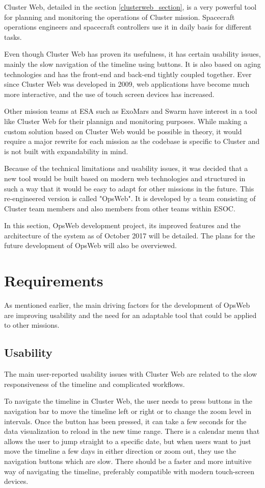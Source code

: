 Cluster Web, detailed in the section \ref{clusterweb_section}, is a very powerful tool for planning and monitoring the operations of Cluster mission. Spacecraft operations engineers and spacecraft controllers use it in daily basis for different tasks.

Even though Cluster Web has proven its usefulness, it has certain usability issues, mainly the slow navigation of the timeline using buttons. It is also based on aging technologies and has the front-end and back-end tightly coupled together. Ever since Cluster Web was developed in 2009, web applications have become much more interactive, and the use of touch screen devices has increased.

Other mission teams at ESA such as ExoMars and Swarm have interest in a tool like Cluster Web for their plannign and monitoring purposes. While making a custom solution based on Cluster Web would be possible in theory, it would require a major rewrite for each mission as the codebase is specific to Cluster and is not built with expandability in mind.

Because of the technical limitations and usability issues, it was decided that a new tool would be built based on modern web technologies and structured in such a way that it would be easy to adapt for other missions in the future. This re-engineered version is called "OpsWeb". It is developed by a team consisting of Cluster team members and also members from other teams within ESOC.

In this section, OpsWeb development project, its improved features and the architecture of the system as of October 2017 will be detailed. The plans for the future development of OpsWeb will also be overviewed.

\section{Requirements}
As mentioned earlier, the main driving factors for the development of OpsWeb are improving usability and the need for an adaptable tool that could be applied to other missions.
\subsection{Usability} \label{usability_req}
The main user-reported usability issues with Cluster Web are related to the slow responsiveness of the timeline and complicated workflows. 

To navigate the timeline in Cluster Web, the user needs to press buttons in the navigation bar to move the timeline left or right or to change the zoom level in intervals. Once the button has been pressed, it can take a few seconds for the data visualization to reload in the new time range. There is a calendar menu that allows the user to jump straight to a specific date, but when users want to just move the timeline a few days in either direction or zoom out, they use the navigation buttons which are slow. There should be a faster and more intuitive way of navigating the timeline, preferably compatible with modern touch-screen devices.

